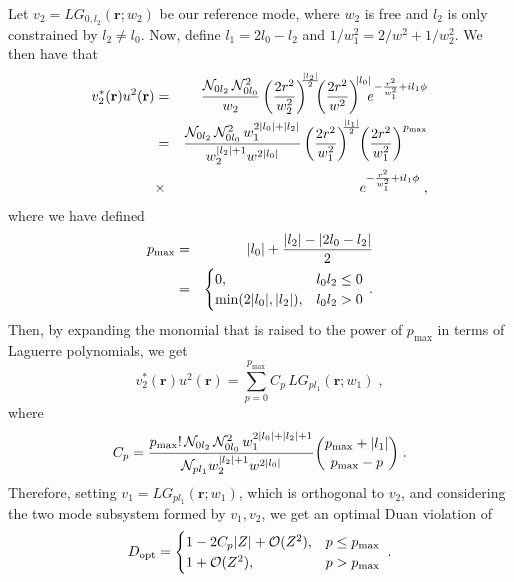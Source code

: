 \documentclass[%
 reprint,
 amsmath,amssymb,
 aps,
pra,
twocolumn,
]{revtex4-2}
\begin{document}
Let $v_2 = LG_{0,l_2}(\mathbf{r}; w_2)$ be our reference mode, where $w_2$ is free and $l_2$ is only constrained by $l_2 \ne l_0$. Now, define $l_1 = 2l_0-l_2$ and $1/w_1^2 = 2/w^2 + 1 /w_2^2$. We then have that
%
\begin{eqnarray}
        v_2^*(\mathbf{r})u^2(\mathbf{r})
        &=& \frac{\mathcal{N}_{0l_2}\,\mathcal{N}_{0l_0}^2}{w_2}
        \left(\frac{2r^2}{w_2^2}\right)^{\!\!\!\frac{\abs{l_2}}{2}}\!\!\!
        \left(\frac{2r^2}{w^2}\right)^{\!\!\abs{l_0}} \!\!\!e^{-\frac{r^2}{w_1^2}+il_1\phi}
        \nonumber\\
        &=& \frac{\mathcal{N}_{0l_2}\,\mathcal{N}_{0l_0}^2 \,w_1^{2\abs{l_0}+\abs{l_2}}}
        {w_2^{\abs{l_2}+1}w^{2\abs{l_0}}}
        \left(\frac{2r^2}{w_1^2}\right)^{\!\!\!\frac{\abs{l_1}}{2}}\!\!
        \left(\frac{2r^2}{w_1^2}\right)^{p_{\text{max}}}
        \nonumber\\
        &\times& e^{-\frac{r^2}{w_1^2}+il_1\phi}\;,
\end{eqnarray}
%
where we have defined
%
\begin{eqnarray}
    \label{eq:radial_cutoff}
    p_{\text{max}} &=& \abs{l_0}+\frac{\abs{l_2} - \abs{2l_0 - l_2}}{2}
    \nonumber\\
    &=& \begin{cases}
        0, & l_0l_2 \le 0 \\
        \min(2\abs{l_0}, \abs{l_2}), & l_0l_2 > 0
    \end{cases}
    \,.
\end{eqnarray}
%
Then, by expanding the monomial that is raised to the power of $p_{\text{max}}$ in terms of Laguerre polynomials, we get
%
\begin{equation}
    v_2^*(\mathbf{r}) u^2(\mathbf{r}) = \sum_{p=0}^{p_{\text{max}}} C_{p}\,LG_{pl_1}(\mathbf{r}; w_1)\;,
\end{equation}
%
where
%
\begin{equation}
    \label{eq:radial_coefficients}
    C_p = \frac{p_{\text{max}}!\,\mathcal{N}_{0l_2} \,\mathcal{N}_{0l_0}^2 \,w_1^{2\abs{l_0} + \abs{l_2} + 1}}{\mathcal{N}_{pl_1}w_2^{\abs{l_2}+1}w^{2\abs{l_0}}} \binom{p_{\text{max}} + \abs{l_1}}{p_{\text{max}} - p}\;.
\end{equation}
%
Therefore, setting $v_1 = LG_{pl_1}(\mathbf{r}; w_1)$, which is orthogonal to $v_2$, and considering the two mode subsystem formed by $v_1, v_2$, we get an optimal Duan violation of
%
\begin{equation}
    \label{eq:radial_duan}
    D_{\text{opt}} = \begin{cases}
        1 - 2C_p \abs{Z}+\mathcal{O}(Z^2), & p \le p_{\text{max}} \\
        1+\mathcal{O}(Z^2), & p > p_{\text{max}}
    \end{cases}\;.
\end{equation}
\end{document}
